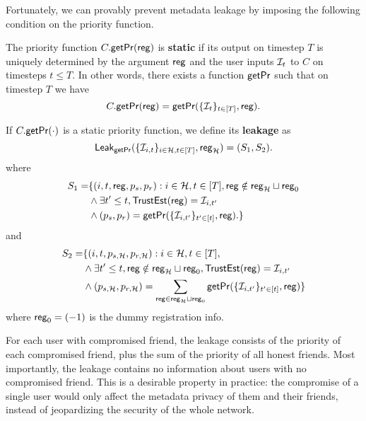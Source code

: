 Fortunately, we can provably prevent metadata leakage by imposing the following condition on the priority function.

\begin{definition}
\label{defn:messaging-static-priority}
The priority function $C.\mathsf{getPr}(\mathsf{reg})$ is \textbf{static} if its output on timestep $T$ is uniquely determined by the argument $\mathsf{reg}$ and the user inputs $\mathcal{I}_t$ to $C$ on timesteps $t \leq T$. In other words, there exists a function $\mathsf{getPr}$ such that on timestep $T$ we have
$$C.\mathsf{getPr}(\mathsf{reg}) = \mathsf{getPr}(\{\mathcal{I}_{t}\}_{t \in [T]}, \mathsf{reg}).$$

If $C.\mathsf{getPr}(\cdot)$ is a static priority function, we define its \textbf{leakage} as
$$\mathsf{Leak}_{\mathsf{getPr}}(\{\mathcal{I}_{i, t}\}_{i \in \mathcal{H}, t \in [T]}, \mathsf{reg}_{\mathcal{H}}) = (S_1, S_2).$$
where
\begin{align*} 
S_1 =& \{(i, t, \mathsf{reg}, p_{s}, p_{r}): i \in \mathcal{H}, t \in [T], \mathsf{reg} \notin \mathsf{reg}_{\mathcal{H}} \sqcup \mathsf{reg}_0 \\
 &\land \exists t' \leq t, \mathsf{TrustEst}(\mathsf{reg}) = \mathcal{I}_{i, t'}  \\
  &\land (p_{s}, p_{r}) = \mathsf{getPr}(\{\mathcal{I}_{i, t'}\}_{t' \in [t]}, \mathsf{reg}).\}
\end{align*}
and
\begin{align*} 
S_2 =& \{(i, t, p_{s, \mathcal{H}}, p_{r, \mathcal{H}}): i \in \mathcal{H}, t \in [T],  \\
 &\land \exists t' \leq t, \mathsf{reg} \notin \mathsf{reg}_{\mathcal{H}} \sqcup \mathsf{reg}_0, \mathsf{TrustEst}(\mathsf{reg}) = \mathcal{I}_{i, t'}  \\
  &\land (p_{s, \mathcal{H}}, p_{r, \mathcal{H}}) = \sum_{\mathsf{reg} \in \mathsf{reg}_{\mathcal{H}} \sqcup \mathsf{reg}_0} \mathsf{getPr}(\{\mathcal{I}_{i, t'}\}_{t' \in [t]}, \mathsf{reg})\}
\end{align*}
where $\mathsf{reg}_0 = (-1)$ is the dummy registration info.
\end{definition}
For each user with compromised friend, the leakage consists of the priority of each compromised friend, plus the sum of the priority of all honest friends. Most importantly, the leakage contains no information about users with no compromised friend. This is a desirable property in practice: the compromise of a single user would only affect the metadata privacy of them and their friends, instead of jeopardizing the security of the whole network.

